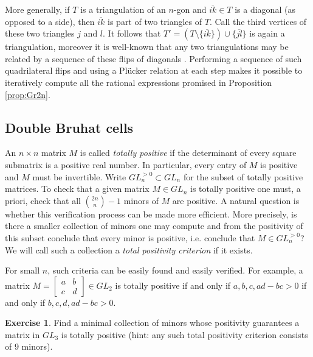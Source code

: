 \documentclass{amsart}
\theoremstyle{definition}
\newtheorem{example}[theorem]{Example}
\newtheorem{exercise}[theorem]{Exercise}
\theoremstyle{remark}
\numberwithin{equation}{section}
\begin{document}
		More generally, if $T$ is a triangulation of an $n$-gon and $\overline{ik} \in T$ is a diagonal (as opposed to a side), then $\overline{ik}$ is part of two triangles of $T$.  Call the third vertices of these two triangles $j$ and $l$.  It follows that $T' = (T \setminus \{\overline{ik}\}) \cup \{\overline{jl}\}$ is again a triangulation, moreover it is well-known that any two triangulations may be related by a sequence of these flips of diagonals \cite{H91}.  Performing a sequence of such quadrilateral flips and using a Pl\"ucker relation at each step makes it possible to iteratively compute all the rational expressions promised in Proposition \ref{prop:Gr2n}.
 
	\subsection{Double Bruhat cells} \label{sub:total positivity}
    An $n\times n$ matrix $M$ is called \emph{totally positive} if the determinant of every square submatrix is a positive real number.  In particular, every entry of $M$ is positive and $M$ must be invertible.  Write $GL_n^{>0}\subset GL_n$ for the subset of totally positive matrices.  To check that a given matrix $M\in GL_n$ is totally positive one must, a priori, check that all ${2n\choose n}-1$ minors of $M$ are positive.  A natural question is whether this verification process can be made more efficient.  More precisely, is there a smaller collection of minors one may compute and from the positivity of this subset conclude that every minor is positive, i.e. conclude that $M\in GL_n^{>0}$?  We will call such a collection a \emph{total positivity criterion} if it exists.  

    For small $n$, such criteria can be easily found and easily verified.  For example, a matrix $M=\left[\begin{array}{cc} a & b\\ c & d\end{array}\right]\in GL_2$ is totally positive if and only if $a,b,c,ad-bc>0$ if and only if $b,c,d,ad-bc>0$.
    \begin{exercise}\label{exer:gl3 positivity}
      Find a minimal collection of minors whose positivity guarantees a matrix in $GL_3$ is totally positive (hint: any such total positivity criterion consists of 9 minors).
    \end{exercise}
\end{document}

